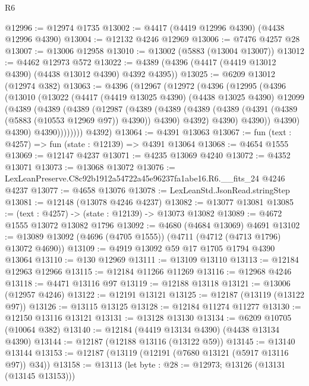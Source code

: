 \begin{lexlean}{R6}
\begin{coremodule}
@12996 := @12974 @1735
@13002 := @4417 (@4419 @12996 @4390) (@4438 @12996 @4390)
@13004 := @12132 @4246 @12969
@13006 := @7476 @4257 @28
@13007 := @13006 @12958
@13010 := @13002 (@5883 (@13004 @13007))
@13012 := @4462 @12973 @572
@13022 := @4389 (@4396 (@4417 (@4419 @13012 @4390) (@4438 @13012 @4390) @4392 @4395))
@13025 := @6209 @13012 (@12974 @382)
@13063 := @4396
    (@12967
      (@12972
        (@4396
          (@12995
            (@4396
              (@13010
                (@13022
                  (@4417
                    (@4419 @13025 @4390)
                    (@4438 @13025 @4390)
                    @12099
                    (@4389
                      (@4389
                        (@4389
                          (@12987
                            (@4389
                              (@4389
                                (@4389
                                  (@4389 (@4391 (@4389 (@5883 (@10553 @12969 @97)) @4390)) @4390)
                                  @4392)
                                @4390)
                              @4390))
                          @4390)
                        @4390)
                      @4390))))))))
      @4392)
@13064 := @4391 @13063
@13067 := fun (text : @4257) => fun (state : @12139) => @4391 @13064
@13068 := @4654 @1555
@13069 := @12147 @4237
@13071 := @4235 @13069 @4240
@13072 := @4352 @13071
@13073 := @13068 @13072
@13076 := LexLeanPreserve.C8c92b1912a54722a45e96237fa1abe16.R6.__fits_24 @4246 @4237
@13077 := @4658 @13076
@13078 := LexLeanStd.JsonRead.stringStep
@13081 := @12148 (@13078 @4246 @4237)
@13082 := @13077 @13081
@13085 := (text : @4257) -> (state : @12139) -> @13073 @13082
@13089 := @4672 @1555 @13072 @13082 @1796
@13092 := @4680 (@4684 @13069) @4691
@13102 := @13089 @13092 (@4696 (@4705 @1555)) (@4711 (@4712 (@4713 @1796) @13072 @4690))
@13109 := @4919 @13092 @59 @17 @1705 @1794 @4390 @13064
@13110 := @130 @12969
@13111 := @13109 @13110
@13113 := @12184 @12963 @12966
@13115 := @12184 @11266 @11269
@13116 := @12968 @4246
@13118 := @4471 @13116 @97
@13119 := @12188 @13118
@13121 := @13006 (@12957 @4246)
@13122 := @12191 @13121
@13125 := @12187 (@13119 (@13122 @97))
@13126 := @13115 @13125
@13128 := @12184 @11274 @11277
@13130 := @12150 @13116 @13121
@13131 := @13128 @13130
@13134 := @6209 @10705 (@10064 @382)
@13140 := @12184 (@4419 @13134 @4390) (@4438 @13134 @4390)
@13144 := @12187 (@12188 @13116 (@13122 @59))
@13145 := @13140 @13144
@13153 := @12187 (@13119 (@12191 (@7680 @13121 (@5917 @13116 @97)) @34))
@13158 := @13113 (let byte : @28 := @12973; @13126 (@13131 (@13145 @13153)))

\end{coremodule}
\end{lexlean}
